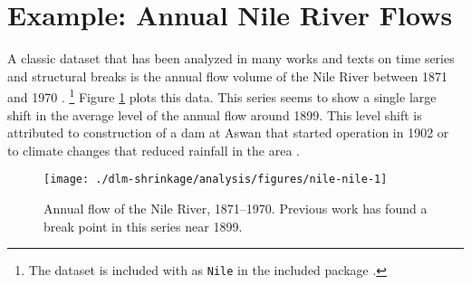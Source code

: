 \documentclass[12pt]{article}
\begin{document}



\section{Example: Annual Nile River Flows}
\label{dlm:sec:nile}

A classic dataset that has been analyzed in many works and texts on time series and structural breaks is the annual flow volume of the Nile River between 1871 and 1970 \parencites{Cobb1978}{Balke1993}{DeJongPenzer1998}{}{DurbinKoopman2012}{CommandeurKoopmanOoms2011}.%
\footnote{The dataset is included with \RLang{} as \texttt{Nile} in the included package .}
Figure \ref{dlm:fig:nile} plots this data.
This series seems to show a single large shift in the average level of the annual flow around 1899.
This level shift is attributed to construction of a dam at Aswan that started operation in 1902 or to climate changes that reduced rainfall in the area \parencite[278]{Cobb1978}.

\begin{figure}
  \centering
  \texttt{[image: ./dlm-shrinkage/analysis/figures/nile-nile-1]}
  \caption[Annual flow of the Nile River, 1871--1970]{Annual flow of the Nile River, 1871--1970. Previous work has found a break point in this series near 1899.}
  \label{dlm:fig:nile}
\end{figure}
\end{document}
